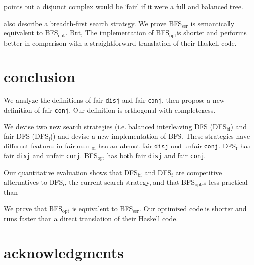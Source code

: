 \documentclass[format=acmlarge, review=true, authordraft=true]{acmart}
\newcommand{\conj}{\texttt{conj}}
\newcommand{\disj}{\texttt{disj}}
\newcommand{\BFSopt}[0]{BFS$_\textrm{opt}$}
\newcommand{\BFSser}[0]{BFS$_\textrm{ser}$}
\begin{document}
\citet{yang2010adventures} points out a disjunct complex would be `fair' 
if it were a full and balanced tree.

\citet{seres1999algebra} also describe a breadth-first search 
strategy. We prove \BFSser{} is semantically equivalent to \BFSopt. But,
The implementation of \BFSopt is shorter and performs better in comparison with a straightforward translation of their Haskell code.

\section{conclusion}

We analyze the definitions of fair \disj{} and fair \conj{}, then propose a 
new definition of fair \conj{}. Our definition is orthogonal with completeness.

We devise two new search strategies (i.e. balanced interleaving DFS 
(DFS$_\textrm{bi}$) and fair DFS (DFS$_\textrm{f}$)) and devise a new 
implementation of BFS. These strategies have different features 
in fairness: $_\textrm{bi}$ has an almost-fair \disj{} and unfair \conj{}. 
DFS$_\textrm{f}$ has fair \disj{} and unfair \conj{}. \BFSopt{} has both fair
\disj{} and fair \conj{}.

Our quantitative evaluation shows that DFS$_\textrm{bi}$ and DFS$_\textrm{f}$ are competitive 
alternatives to DFS$_\textrm{i}$, the current search strategy, and that 
\BFSopt is less practical than 

We prove that \BFSopt{} is equivalent to \BFSser. 
Our optimized code is shorter and runs faster than a direct translation 
of their Haskell code.



\section*{acknowledgments}



\end{document}
